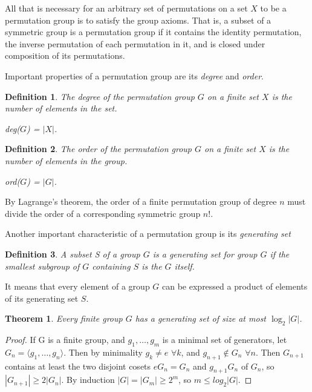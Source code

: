 \documentclass[12pt]{report}
\newtheorem{theorem}{Theorem}[section]
\newtheorem{definition}{Definition}[section]
\begin{document}
All that is necessary for an arbitrary set of permutations on a set $X$ to be a permutation group is to satisfy the group axioms. That is, a subset of a symmetric group is a permutation group if it contains the identity permutation, the inverse permutation of each permutation in it, and is closed under composition of its permutations.

Important properties of a permutation group are its \textit{degree} and \textit{order}.

\begin{definition}
	The degree of the permutation group $G$ on a finite set $X$ is the number of elements in the set.
	
	\begin{center}
		deg($G$) = $|X|$.
	\end{center}
\end{definition}

\begin{definition}
	The order of the permutation group $G$ on a finite set $X$ is the number of elements in the group.
	
	\begin{center}
		ord($G$) = $|G|$.
	\end{center}
\end{definition}

By Lagrange's theorem, the order of a finite permutation group of degree $n$ must divide the order of a corresponding symmetric group $n!$.

Another important characteristic of a permutation group is its \textit{generating set}

\begin{definition}
	A subset S of a group $G$ is a \textit{generating set} for group $G$ if the smallest subgroup of $G$ containing $S$ is the $G$ itself.
\end{definition}

It means that every element of a group $G$ can be expressed a product of elements of its generating set $S$.

\begin{theorem}
	Every finite group $G$ has a generating set of size at most $\log_2 |G|$.
\end{theorem}
\begin{proof}
	If G is a finite group, and ${g_1, \dots, g_m}$ is a minimal set of generators, let $G_n = \langle g_1, \dots, g_n \rangle$. Then by minimality $g_k \neq e$ $\forall k$, and $g_{n+1} \notin G_n$ $\forall n$. Then $G_{n+1}$ contains at least the two disjoint cosets $eG_n = G_n$ and $g_{n+1} G_n$ of $G_n$, so $|G_{n+1}| \geq 2|G_n|$. By induction $|G|=|G_m| \geq 2^m$, so $m \leq log_2 |G|$.
\end{proof}
\end{document}
